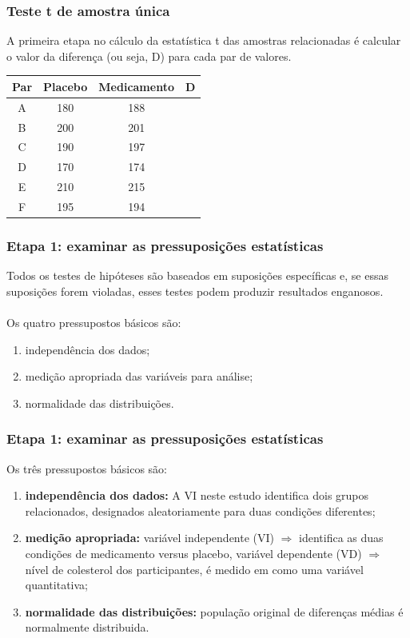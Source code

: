 \documentclass[11pt]{beamer}
\begin{document}
\begin{frame}
\frametitle{Teste t de amostra única}

A primeira etapa no cálculo da estatística t das amostras relacionadas é calcular o valor da diferença (ou seja, D) para cada par de valores. 

\begin{center}
\begin{tabular}{cccc} 
 \hline
Par & Placebo & Medicamento & D \\
 \hline
A & 180 & 188 &  \\
B & 200 & 201 &  \\
C & 190 & 197 &  \\
D & 170 & 174 &  \\
E & 210 & 215 &  \\
F & 195 & 194 &  \\
 \hline
\end{tabular}
\end{center}   

\end{frame}

\begin{frame}
\frametitle{Etapa 1: examinar as pressuposições estatísticas}

Todos os testes de hipóteses são baseados em suposições específicas e, se essas suposições forem violadas, esses testes podem produzir resultados enganosos.\\~\\
Os quatro pressupostos básicos são:

\begin{enumerate}
\item independência dos dados;
\item medição apropriada das variáveis para análise;
\item normalidade das distribuições.
\end{enumerate}

\end{frame}

\begin{frame}
\frametitle{Etapa 1: examinar as pressuposições estatísticas}

Os três pressupostos básicos são:

\begin{enumerate}
\item \textbf{independência dos dados:} A VI neste estudo identifica dois grupos relacionados, designados aleatoriamente para duas condições diferentes;
\item \textbf{medição apropriada:} variável independente (VI) \(\Rightarrow\) identifica as duas condições de medicamento versus placebo, variável dependente (VD) \(\Rightarrow\) nível de colesterol dos participantes, é medido em como uma variável quantitativa;
\item \textbf{normalidade das distribuições:} população original de diferenças médias é normalmente distribuida.
\end{enumerate}

\end{frame}
\end{document}
